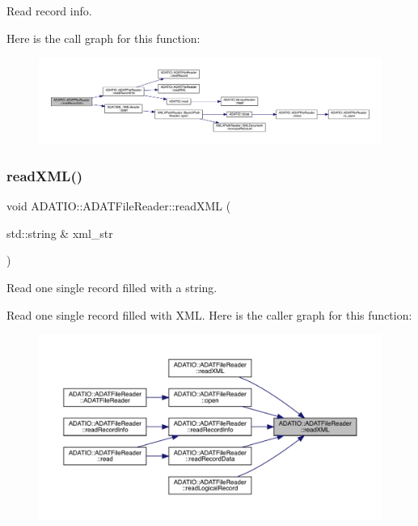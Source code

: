 Read record info. 

Here is the call graph for this function\+:\nopagebreak
\begin{figure}[H]
\begin{center}
\leavevmode
\includegraphics[width=350pt]{db/de5/group__qio_ga4d771a46d7db77cd0ae5999113733795_cgraph}
\end{center}
\end{figure}
\mbox{\label{group__qio_gae57feac2bf53666ac092bb0a43125226}} 
\subsubsection{\texorpdfstring{readXML()}{readXML()}\hspace{0.1cm}{\footnotesize\ttfamily [1/2]}}
{\footnotesize\ttfamily void A\+D\+A\+T\+I\+O\+::\+A\+D\+A\+T\+File\+Reader\+::read\+X\+ML (\begin{DoxyParamCaption}\item[{std\+::string \&}]{xml\+\_\+str }\end{DoxyParamCaption})\hspace{0.3cm}{\ttfamily [protected]}}



Read one single record filled with a string. 

Read one single record filled with X\+ML. Here is the caller graph for this function\+:\nopagebreak
\begin{figure}[H]
\begin{center}
\leavevmode
\includegraphics[width=350pt]{db/de5/group__qio_gae57feac2bf53666ac092bb0a43125226_icgraph}
\end{center}
\end{figure}
\mbox{\label{group__qio_ga9a1ac411577bd50e643f483119318893}} 
